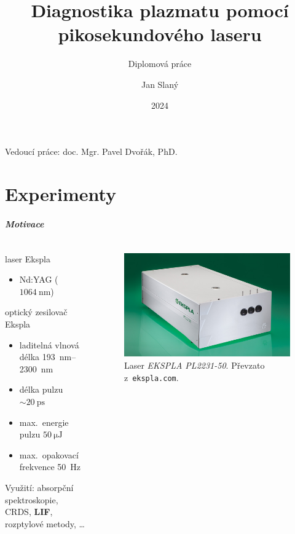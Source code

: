 \documentclass[10pt]{beamer}
\title[Laserová diagnostika plazmatu]
{Diagnostika plazmatu pomocí pikosekundového laseru}
\subtitle{Diplomová práce}
\date{2024}
\author{Jan Slaný}
\institute[PřF MUNI]{Přírodovědecká fakulta Masarykovy univerzity\\
	Ústav fyziky a~technologií plazmatu}
\begin{document}
\begin{frame}[plain]
	\titlepage
	Vedoucí práce: \hfill doc. Mgr. Pavel Dvořák, PhD.
\end{frame}

\part{Experimenty}

\begin{frame}
	\frametitle{Motivace}
	\begin{columns}
	\begin{column}{0.5\textwidth}
		laser Ekspla 
		\begin{itemize}
			\item Nd:YAG ($\SI{1064}{\nano\metre}$)
		\end{itemize}
		\medskip
		optický zesilovač Ekspla 
		\begin{itemize}
			\item laditelná vlnová délka
			\SIrange{193}{2300}{\nano\metre}
			\item délka pulzu $\sim \SI{20}{\pico\second}$
			\item max.~energie pulzu $\SI{50}{\micro\joule}$
			\item max.~opakovací frekvence \SI{50}{\hertz}
		\end{itemize}
		\medskip
		Využití: absorpční spektroskopie, CRDS, \textbf{LIF},
		rozptylové metody, \textbf{\EFISH}\ldots
	\end{column}
	\begin{column}{0.5\textwidth}
		\begin{figure}
			\centering
			\includegraphics[width=\textwidth]{laser}
			\caption{Laser \emph{EKSPLA PL2231-50}.
				Převzato z~\texttt{ekspla.com}.}
		\end{figure}
	\end{column}
	\end{columns}
\end{frame}
\end{document}

